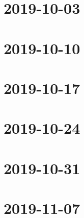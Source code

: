 \documentclass{book}
\begin{document}
\chapter{2019-10-03}


\chapter{2019-10-10}


\chapter{2019-10-17}


\chapter{2019-10-24}


\chapter{2019-10-31}


\chapter{2019-11-07}

\end{document}
